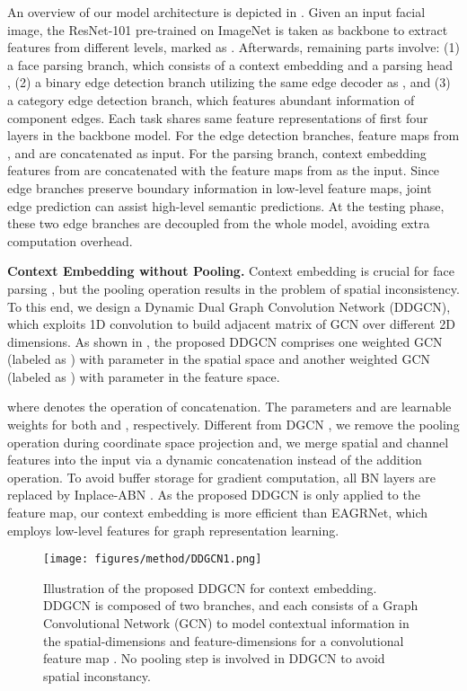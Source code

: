 \documentclass[10pt,twocolumn,letterpaper]{article}
\begin{document}
An overview of our model architecture is depicted in \figureautorefname{ \ref{fig:framwork}}. Given an input facial image, the ResNet-101 \cite{resnet101} pre-trained on ImageNet is taken as backbone to extract features from different levels, marked as . Afterwards, remaining parts involve: (1) a face parsing branch, which consists of a context embedding and a parsing head \cite{te2020edge}, (2) a binary edge detection branch utilizing the same edge decoder as \cite{ce2p}, and (3) a category edge detection branch, which features abundant information of component edges. Each task shares same feature representations of first four layers in the backbone model. For the edge detection branches, feature maps from ,  and  are concatenated as input. For the parsing branch, context embedding features from  are concatenated with the feature maps from  as the input.
Since edge branches preserve boundary information in low-level feature maps, joint edge prediction can assist high-level semantic predictions. At the testing phase, these two edge branches are decoupled from the whole model, avoiding extra computation overhead.

\noindent\textbf{Context Embedding without Pooling.} 
Context embedding is crucial for face parsing \cite{psp, NonLocal2018, dilatedConv1, YuKoltun2016}, but the pooling operation results in the problem of spatial inconsistency. To this end, we design a Dynamic Dual Graph Convolution Network (DDGCN), which exploits 1D convolution to build adjacent matrix of GCN over different 2D dimensions. As shown in \figureautorefname{ \ref{fig:ddgcn}}, the proposed DDGCN comprises one weighted GCN (labeled as ) with parameter  in the spatial space and another weighted GCN (labeled as ) with parameter  in the feature space. 

where  denotes the operation of concatenation. The parameters  and  are learnable weights for both  and , respectively. Different from DGCN \cite{zhangli_dgcn}, we remove the pooling operation during coordinate space projection and, we merge spatial and channel features into the input  via a dynamic concatenation instead of the addition operation. To avoid buffer storage for gradient computation, all BN layers are replaced by Inplace-ABN \cite{inplace}. As the proposed DDGCN is only applied to the  feature map, our context embedding is more efficient than EAGRNet, which employs low-level features for graph representation learning.
\begin{figure}
\centering
\texttt{[image: figures/method/DDGCN1.png]}
\vspace{-6mm}
\caption{Illustration of the proposed DDGCN for context embedding. DDGCN is composed of two branches, and each consists of a Graph Convolutional Network (GCN) to model contextual information in the spatial-dimensions and feature-dimensions for a convolutional feature map . No pooling step is involved in DDGCN to avoid spatial inconstancy.}
\label{fig:ddgcn}
\vspace{-4mm}
\end{figure}
\end{document}
